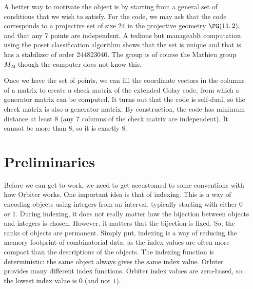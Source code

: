 \documentclass[10pt]{article}
\begin{document}
\bigskip

A better way to motivate the object is by starting from a general set of conditions that we wish to satisfy. For the code, we may ask that the code corresponds to a projective set of size 24 in the projective geometry $\PG(11,2),$ and that any 7 points are independent. 
A tedious but manageablt computation using the poset classification algorithm shows that the set is unique and that is has a stabilizer of order 244823040. The group is of course the Mathieu group $M_{24}$ though the computer does not know this. 

\bigskip

Once we have the set of points, we can fill the coordinate vectors in the columns of a matrix to create a check matrix of the extended Golay code, from which a generator matrix can be computed. 
It turns out that the code is self-dual, so the check matrix is also a generator matrix. 
By construction, the code has minimum distance at least 8 (any 7 columns of the check matrix are independent). It cannot be more than 8, so it is exactly 8. 


\bigskip



\section{Preliminaries}


Before we can get to work, we need to get accustomed to some conventions with how Orbiter 
works. One important idea is that of indexing. This is a way of encoding objects using integers
from an interval, typically starting with either 0 or 1. 
During indexing, it does not really matter how the bijection between objects and integers is chosen. However, it matters that the bijection is fixed. So, the ranks of objects are 
permanent. 
Simply put, indexing is a way of reducing the memory footprint of combinatorial data, 
as the index values are often more compact than the descriptions of the objects. 
The indexing function is deterministic: the same object always gives the same index value. 
Orbiter provides many different index functions. Orbiter index values are zero-based, so the lowest index value is $0$ (and not $1$).


\bigskip
\end{document}
